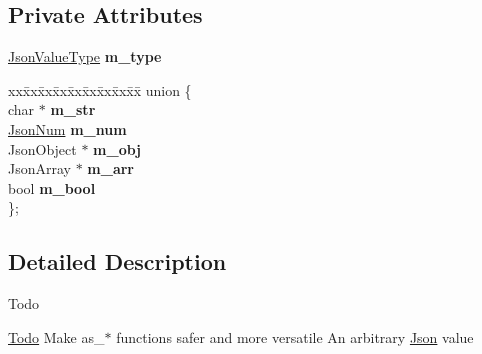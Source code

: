 \subsection*{Private Attributes}
\begin{DoxyCompactItemize}
\item 
\mbox{\label{classnta_1_1utils_1_1Json_ab4a7cc232d1c4ba37f9dcb35f0ac5417}} 
\hyperlink{namespacenta_1_1utils_ac9921c0a3baf86d9facdc4927c66def3}{Json\+Value\+Type} {\bfseries m\+\_\+type}
\item 
\mbox{\label{classnta_1_1utils_1_1Json_a6a4d3082c4d8f9987cb8ce281b87744d}} 
\begin{tabbing}
xx\=xx\=xx\=xx\=xx\=xx\=xx\=xx\=xx\=\kill
union \{\\
\mbox{\label{classnta_1_1utils_1_1Json_ad70123a682fef22afdcf75d20d028e3e}} 
char $\ast$ {\bfseries m\_str}\\
\mbox{\label{classnta_1_1utils_1_1Json_aad4acf20f0eef3112e633df34b799b5a}} 
\hyperlink{classnta_1_1utils_1_1JsonNum}{JsonNum} {\bfseries m\_num}\\
\mbox{\label{classnta_1_1utils_1_1Json_a15a631f10ecc26ba5fba053140bc7500}} 
JsonObject $\ast$ {\bfseries m\_obj}\\
\mbox{\label{classnta_1_1utils_1_1Json_a1ddb791c97e2d345cad4ad63bcb38b6b}} 
JsonArray $\ast$ {\bfseries m\_arr}\\
\mbox{\label{classnta_1_1utils_1_1Json_a4ca79ced26d31b35a7d2f9e0fc8ec347}} 
bool {\bfseries m\_bool}\\
\}; \\

\end{tabbing}\end{DoxyCompactItemize}


\subsection{Detailed Description}
\begin{DoxyRefDesc}{Todo}
\item[\hyperlink{todo__todo000006}{Todo}]Make as\+\_\+$\ast$ functions safer and more versatile An arbitrary \hyperlink{classnta_1_1utils_1_1Json}{Json} value \end{DoxyRefDesc}


